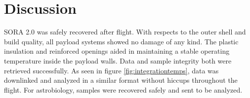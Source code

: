\clearpage
\section{Discussion}
\label{sec:Discussion}
SORA 2.0 was safely recovered after flight.  With respects to the outer shell and build quality, all payload systems showed no damage of any kind.  The plastic insulation and reinforced openings aided in maintaining a stable operating temperature inside the payload walls.  Data and sample integrity both were retrieved successfully.  As seen in figure \ref{fig:integrationtemps}, data was downlinked and analyzed in a similar format without hiccups throughout the flight.  For astrobiology, samples were recovered safely and sent to be analyzed.  